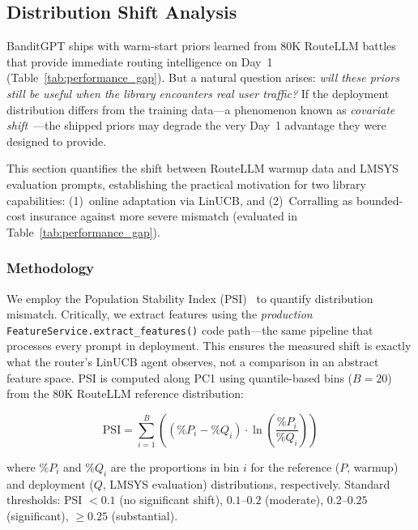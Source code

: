 
\subsection{Distribution Shift Analysis}
\label{sec:distribution_shift}

BanditGPT ships with warm-start priors learned from 80K RouteLLM battles that provide immediate routing intelligence on Day~1 (Table~\ref{tab:performance_gap}). But a natural question arises: \emph{will these priors still be useful when the library encounters real user traffic?} If the deployment distribution differs from the training data---a phenomenon known as \emph{covariate shift}~\cite{shimodaira2000improving}---the shipped priors may degrade the very Day~1 advantage they were designed to provide.

This section quantifies the shift between RouteLLM warmup data and LMSYS evaluation prompts, establishing the practical motivation for two library capabilities: (1)~online adaptation via LinUCB, and (2)~Corralling as bounded-cost insurance against more severe mismatch (evaluated in Table~\ref{tab:performance_gap}).

\subsubsection{Methodology}

We employ the Population Stability Index (PSI)~\cite{yurdakul2018statistical} to quantify distribution mismatch. Critically, we extract features using the \emph{production} \texttt{FeatureService.extract\_features()} code path---the same pipeline that processes every prompt in deployment. This ensures the measured shift is exactly what the router's LinUCB agent observes, not a comparison in an abstract feature space. PSI is computed along PC1 using quantile-based bins ($B=20$) from the 80K RouteLLM reference distribution:

\begin{equation}
\text{PSI} = \sum_{i=1}^{B} \left( (\%P_i - \%Q_i) \cdot \ln\left(\frac{\%P_i}{\%Q_i}\right) \right)
\label{eq:psi}
\end{equation}

\noindent where $\%P_i$ and $\%Q_i$ are the proportions in bin $i$ for the reference ($P$, warmup) and deployment ($Q$, LMSYS evaluation) distributions, respectively. Standard thresholds: PSI $< 0.1$ (no significant shift), $0.1$--$0.2$ (moderate), $0.2$--$0.25$ (significant), $\geq 0.25$ (substantial).

